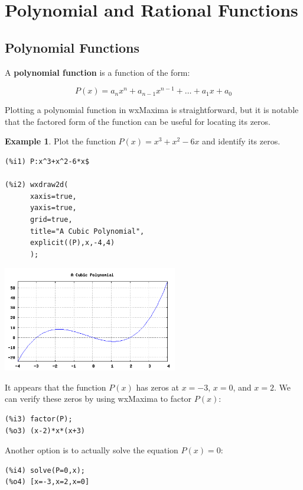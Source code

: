 \documentclass[10.5pt,twoside]{report}
\theoremstyle{definition}
\newtheorem{exmp}{Example}[section]
\begin{document}
\pagebreak



\section{Polynomial and Rational Functions}\label{Polynomial and Rational Functions}

\subsection{Polynomial Functions}

A \textbf{polynomial function} is a function of the form:

$$P(x)=a_{n}x^{n}+a_{n-1}x^{n-1}+\dots+a_{1}x+a_{0}$$

Plotting a polynomial function in wxMaxima is straightforward, but it is notable that the factored form of the function can be useful for locating its zeros.

\begin{exmp}
Plot the function $P(x)=x^{3}+x^{2}-6x$ and identify its zeros.\\


\begin{verbatim}
(%i1) P:x^3+x^2-6*x$

(%i2) wxdraw2d(
      xaxis=true,
      yaxis=true,
      grid=true,
      title="A Cubic Polynomial",
      explicit((P),x,-4,4)
      );
\end{verbatim}


\includegraphics[width=3in]{example_1_1_1}



It appears that the function $P(x)$ has zeros at $x=-3$, $x=0$, and $x=2$.  We can verify these zeros by using wxMaxima to factor $P(x)$:

\begin{verbatim}
(%i3) factor(P);
(%o3) (x-2)*x*(x+3)
\end{verbatim}

Another option is to actually solve the equation $P(x)=0$:

\begin{verbatim}
(%i4) solve(P=0,x);
(%o4) [x=-3,x=2,x=0]
\end{verbatim}

\end{exmp}\
\end{document}
